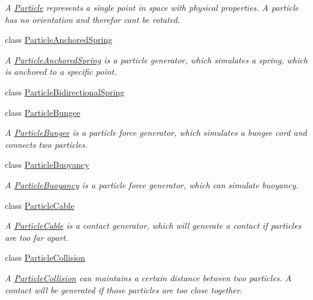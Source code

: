 \begin{DoxyCompactItemize}
\begin{DoxyCompactList}\small\item\em A \mbox{\hyperlink{classr3_1_1_particle}{Particle}} represents a single point in space with physical properties. A particle has no orientation and therefor can\textquotesingle{}t be rotated. \end{DoxyCompactList}\item 
class \mbox{\hyperlink{classr3_1_1_particle_anchored_spring}{Particle\+Anchored\+Spring}}
\begin{DoxyCompactList}\small\item\em A \mbox{\hyperlink{classr3_1_1_particle_anchored_spring}{Particle\+Anchored\+Spring}} is a particle generator, which simulates a spring, which is anchored to a specific point. \end{DoxyCompactList}\item 
class \mbox{\hyperlink{classr3_1_1_particle_bidirectional_spring}{Particle\+Bidirectional\+Spring}}
\item 
class \mbox{\hyperlink{classr3_1_1_particle_bungee}{Particle\+Bungee}}
\begin{DoxyCompactList}\small\item\em A \mbox{\hyperlink{classr3_1_1_particle_bungee}{Particle\+Bungee}} is a particle force generator, which simulates a bungee cord and connects two particles. \end{DoxyCompactList}\item 
class \mbox{\hyperlink{classr3_1_1_particle_buoyancy}{Particle\+Buoyancy}}
\begin{DoxyCompactList}\small\item\em A \mbox{\hyperlink{classr3_1_1_particle_buoyancy}{Particle\+Buoyancy}} is a particle force generator, which can simulate buoyancy. \end{DoxyCompactList}\item 
class \mbox{\hyperlink{classr3_1_1_particle_cable}{Particle\+Cable}}
\begin{DoxyCompactList}\small\item\em A \mbox{\hyperlink{classr3_1_1_particle_cable}{Particle\+Cable}} is a contact generator, which will generate a contact if particles are too far apart. \end{DoxyCompactList}\item 
class \mbox{\hyperlink{classr3_1_1_particle_collision}{Particle\+Collision}}
\begin{DoxyCompactList}\small\item\em A \mbox{\hyperlink{classr3_1_1_particle_collision}{Particle\+Collision}} can maintains a certain distance between two particles. A contact will be generated if those particles are too close together. \end{DoxyCompactList}\item 

\end{DoxyCompactItemize}
